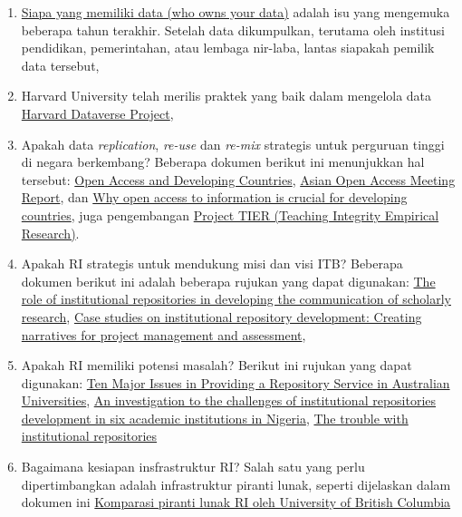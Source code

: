 \documentclass[a4paper]{article}
\begin{document}
\begin{enumerate}
\item \href{http://osc.universityofcalifornia.edu/2016/09/who-owns-your-data/}{Siapa yang memiliki data (who owns your data)} adalah isu yang mengemuka beberapa tahun terakhir. Setelah data dikumpulkan, terutama oleh institusi pendidikan, pemerintahan, atau lembaga nir-laba, lantas siapakah pemilik data tersebut,

\item Harvard University telah merilis praktek yang baik dalam mengelola data \href{https://dataverse.org/best-practices/harvard-dataverse-general-terms-use}{Harvard Dataverse Project},

\item Apakah data \textit{replication}, \textit{re-use} dan \textit{re-mix} strategis untuk perguruan tinggi di negara berkembang? Beberapa dokumen berikut ini menunjukkan hal tersebut: \href{http://www.openoasis.org/index.php?option=com_content&view=article&id=28:developing-countries&Itemid=253}{Open Access and Developing Countries}, \href{https://www.coar-repositories.org/files/Open-Access-Asia-Report.pdf}{Asian Open Access Meeting
Report}, dan \href{https://www.weforum.org/agenda/2015/08/why-open-access-to-information-is-crucial-for-developing-countries/}{Why open access to information is crucial for developing countries}, juga pengembangan \href{http://www.projecttier.org/}{Project TIER (Teaching Integrity Empirical Research)}.

\item Apakah RI strategis untuk mendukung misi dan visi ITB? Beberapa dokumen berikut ini adalah beberapa rujukan yang dapat digunakan: \href{http://www.emeraldinsight.com/doi/abs/10.1108/OCLC-04-2014-0022}{The role of institutional repositories in developing the communication of scholarly research}, \href{http://citeseerx.ist.psu.edu/viewdoc/download?doi=10.1.1.474.8441&rep=rep1&type=pdf}{Case studies on institutional repository development: Creating narratives for project management and assessment},

\item Apakah RI memiliki potensi masalah? Berikut ini rujukan yang dapat digunakan: \href{http://www.dlib.org/dlib/may07/henty/05henty.html}{Ten Major Issues in Providing a Repository Service in Australian Universities}, \href{http://www.ijodls.in/uploads/3/6/0/3/3603729/vol-2_issue-4_1-16.pdf}{An investigation to the challenges of institutional repositories development in six academic institutions in Nigeria},
\href{http://cameronneylon.net/blog/the-trouble-with-institutional-repositories/}{The trouble with institutional repositories}

\item Bagaimana kesiapan insfrastruktur RI? Salah satu yang perlu dipertimbangkan adalah infrastruktur piranti lunak, seperti dijelaskan dalam dokumen ini \href{https://open.library.ubc.ca/cIRcle/collections/graduateresearch/42591/items/1.0075768}{Komparasi piranti lunak RI oleh University of  British Columbia}

\end{enumerate}
\end{document}
